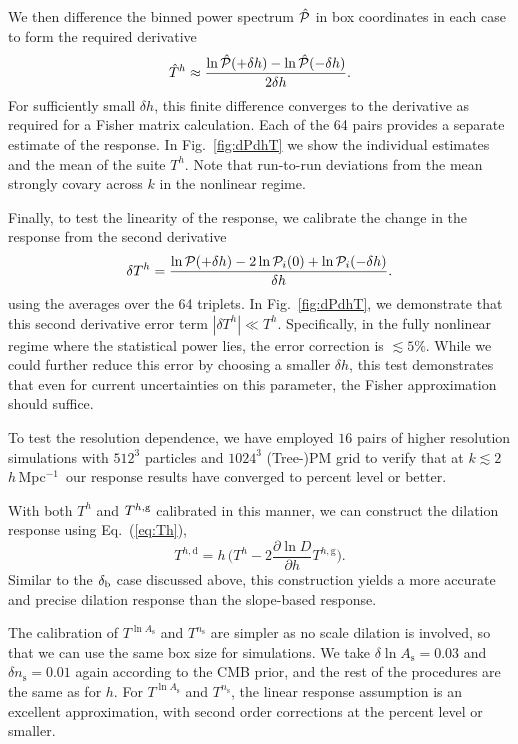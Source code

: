 \documentclass[prd,twocolumn,amsmath,amssymb,floatfix,superscriptaddress]{revtex4-1}
\newcommand{\lnAs}{{\ln\!A_\textrm{s}}}
\newcommand{\ns}{{n_\textrm{s}}}
\newcommand{\br}{{\rm b}}
\newcommand{\hMpci}{$h\,$Mpc$^{-1}$}
\newcommand{\Dv}{{\cal P}}
\begin{document}
{{We then difference the binned power spectrum $\hat\Dv$ in box coordinates
in each case to form the required derivative
\begin{equation}
    \hat T^h  \approx \frac{\ln\hat\Dv(+\delta h)-\ln\hat\Dv(-\delta h)}{2\delta h}.
\end{equation}
  For sufficiently small $\delta h$,
this finite difference converges to the derivative as required for a Fisher matrix calculation.
Each {of the 64 pairs}
provides a separate estimate of the response.   In 
Fig.~\ref{fig:dPdhT} we show the individual estimates and the mean of the suite $T^h$.
Note that run-to-run deviations from the mean strongly covary across $k$ in the
nonlinear regime.

Finally, 
to test the linearity of the response, we calibrate the change in the response from the second derivative
\begin{equation}
\delta T^h   =\frac{ \ln\Dv(+\delta h)-2\ln\Dv_i(0)+\ln\Dv_i(-\delta h)}{\delta h}.
\end{equation}
using the averages over the 64 triplets.
In Fig.~\ref{fig:dPdhT}, we demonstrate that
this second derivative error term
$|\delta T^h |\ll T^h$.  Specifically, in the fully nonlinear regime where the statistical 
power lies, the error correction is $\lesssim 5\%$.   While we could further reduce
this error by choosing a smaller $\delta h$, this test demonstrates that even for
current uncertainties on this parameter, the Fisher approximation should suffice.   


    To test the resolution dependence,
    we have employed $16$ pairs of higher resolution simulations with $512^3$ particles
    and $1024^3$ (Tree-)PM grid to verify that at $k\lesssim2 \,$\hMpci\ 
    our response results have converged to percent level or better.

With both $T^h$ and $T^{h,\rm{g}}$ calibrated in this manner, we can construct
the dilation response using Eq.~(\ref{eq:Th}), 
\begin{equation}
     T^{h,\textrm{d}} = h \, \Big(  T^h - 2\frac{\partial\ln D}{\partial h}  T^{h,\textrm{g}} \Big).
    \label{eq:Thd}
\end{equation}
Similar to the $\delta_\br$ case discussed above, this construction yields a more
accurate and precise dilation response than the slope-based response. 


The calibration of $T^\lnAs$ and $T^\ns$ are simpler as no scale dilation is involved,
so that we can use the same box size for simulations.
We take $\delta\lnAs=0.03$ and $\delta\ns=0.01$ again according to the CMB prior,
and the rest of the procedures are the same as for $h$.
For $T^\lnAs$ and $T^\ns$, the linear response assumption is an excellent approximation,
with  second order corrections at the percent level or smaller.



}}
\end{document}
